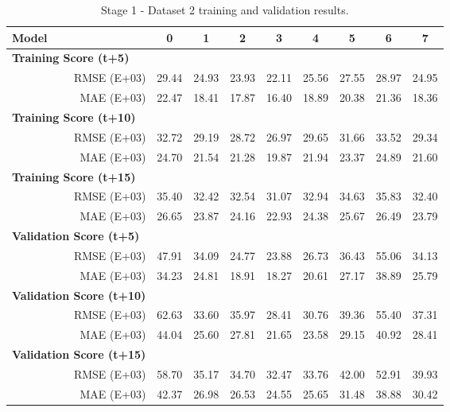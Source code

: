 \begin{table}[htbp]
  \centering
  \caption{Stage 1 - Dataset 2 training and validation results.}
    \begin{tabular}{cr|cccccccc}
    \toprule
    \multicolumn{1}{l}{\textbf{Model}} &       & 0     & 1     & 2     & 3     & 4     & 5     & 6     & 7 \\
    \midrule
    \multicolumn{2}{l|}{\textbf{Training Score (t+5)}} &       &       &       &       &       &       &       &  \\
          & RMSE (E+03) & 29.44 & 24.93 & 23.93 & 22.11 & 25.56 & 27.55 & 28.97 & 24.95 \\
          & MAE (E+03) & 22.47 & 18.41 & 17.87 & 16.40 & 18.89 & 20.38 & 21.36 & 18.36 \\
    \multicolumn{2}{l|}{\textbf{Training Score (t+10)}} &       &       &       &       &       &       &       &  \\
          & RMSE (E+03) & 32.72 & 29.19 & 28.72 & 26.97 & 29.65 & 31.66 & 33.52 & 29.34 \\
          & MAE (E+03) & 24.70 & 21.54 & 21.28 & 19.87 & 21.94 & 23.37 & 24.89 & 21.60 \\
    \multicolumn{2}{l|}{\textbf{Training Score (t+15)}} &       &       &       &       &       &       &       &  \\
          & RMSE (E+03) & 35.40 & 32.42 & 32.54 & 31.07 & 32.94 & 34.63 & 35.83 & 32.40 \\
          & MAE (E+03) & 26.65 & 23.87 & 24.16 & 22.93 & 24.38 & 25.67 & 26.49 & 23.79 \\
    \midrule
    \multicolumn{2}{l|}{\textbf{Validation Score (t+5)}} &       &       &       &       &       &       &       &  \\
          & RMSE (E+03) & 47.91 & 34.09 & 24.77 & 23.88 & 26.73 & 36.43 & 55.06 & 34.13 \\
          & MAE (E+03) & 34.23 & 24.81 & 18.91 & 18.27 & 20.61 & 27.17 & 38.89 & 25.79 \\
    \multicolumn{2}{l|}{\textbf{Validation Score (t+10)}} &       &       &       &       &       &       &       &  \\
          & RMSE (E+03) & 62.63 & 33.60 & 35.97 & 28.41 & 30.76 & 39.36 & 55.40 & 37.31 \\
          & MAE (E+03) & 44.04 & 25.60 & 27.81 & 21.65 & 23.58 & 29.15 & 40.92 & 28.41 \\
    \multicolumn{2}{l|}{\textbf{Validation Score (t+15)}} &       &       &       &       &       &       &       &  \\
          & RMSE (E+03) & 58.70 & 35.17 & 34.70 & 32.47 & 33.76 & 42.00 & 52.91 & 39.93 \\
          & MAE (E+03) & 42.37 & 26.98 & 26.53 & 24.55 & 25.65 & 31.48 & 38.88 & 30.42 \\
    \end{tabular}%
  \label{table5}%
\end{table}%




